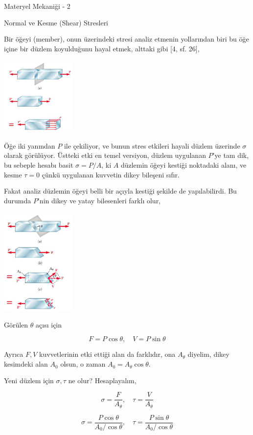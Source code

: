\documentclass[12pt,fleqn]{article}\usepackage{../../common}
\begin{document}
Materyel Mekaniği - 2

Normal ve Kesme (Shear) Stresleri

Bir öğeyi (member), onun üzerindeki stresi analiz etmenin yollarından
biri bu öğe içine bir düzlem koyulduğunu hayal etmek, alttaki gibi [4, sf. 26],

\includegraphics[width=10em]{phy_020_strs_06_05.jpg}

Öğe iki yanından $P$ ile çekiliyor, ve bunun stres etkileri hayali düzlem
üzerinde $\sigma$ olarak görülüyor. Üstteki etki en temel versiyon, düzlem
uygulanan $P$'ye tam dik, bu sebeple hesabı basit $\sigma = P / A$, ki $A$
düzlemin öğeyi kestiği noktadaki alanı, ve kesme $\tau = 0$ çünkü uygulanan
kuvvetin dikey bileşeni sıfır.

Fakat analiz düzlemin öğeyi belli bir açıyla kestiği şekilde de yapılabilirdi.
Bu durumda $P$'nin dikey ve yatay bilesenleri farklı olur, 

\includegraphics[width=10em]{phy_020_strs_06_06.jpg}

Görülen $\theta$ açısı için

$$
F = P \cos \theta, \quad V = P \sin \theta
$$

Ayrıca $F,V$ kuvvetlerinin etki ettiği alan da farklıdır, ona $A_\theta$
diyelim, dikey kesimdeki alan $A_0$ olsun, o zaman $A_0 = A_\theta \cos \theta$.

Yeni düzlem için $\sigma,\tau$ ne olur? Hesaplayalım,

$$
\sigma = \frac{F}{A_\theta}, \quad \tau = \frac{V}{A_\theta}
$$

$$
\sigma = \frac{P \cos \theta}{A_0 / \cos\theta}, \quad
\tau = \frac{P \sin \theta}{A_0 / \cos\theta}
$$
\end{document}
